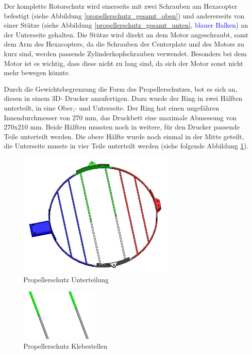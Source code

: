 	Der komplette Rotorschutz wird einerseits mit zwei Schrauben am Hexacopter befestigt (siehe Abbildung \ref{propellerschutz_gesamt_oben}) und andererseits von einer Stütze (siehe Abbildung  \ref{propellerschutz_gesamt_unten},
	\textcolor{blue}{blauer Balken}) an der Unterseite gehalten.
	Die Stütze wird direkt an dem Motor angeschraubt, samt dem Arm des Hexacopters, da die Schrauben der Centerplate und des Motors zu kurz sind, werden passende Zylinderkopfschrauben verwendet.
	Besonders bei dem Motor ist es wichtig, dass diese nicht zu lang sind, da sich der Motor sonst nicht mehr bewegen könnte.

	Durch die Gewichtsbegrenzung \bzw die Form des Propellerschutzes, bot es sich an, diesen in einem 3D- Drucker anzufertigen.
	Dazu wurde der Ring in zwei Hälften unterteilt, in eine Ober,- und Unterseite.
	Der Ring hat einen ungefähren Innendurchmesser von 270 mm, das Druckbett eine maximale Abmessung von 270x210 mm.
	Beide Hälften mussten noch in weitere, für den Drucker passende Teile unterteilt werden.
	Die obere Hälfte wurde noch einmal in der Mitte geteilt, die Unterseite musste in vier Teile unterteilt werden (siehe folgende Abbildung \ref{propellerschutz_mitte_unterteilung}).

			\begin{figure}[H]
			\begin{centering}
			\includegraphics[width = 0.7\textwidth]{Bilder/propellerschutz_mitte_unterteilung}
			\par\end{centering}
			\caption{Propellerschutz Unterteilung}
			\label{propellerschutz_mitte_unterteilung}
			\end{figure}

			\begin{figure}[H]
			\begin{centering}
			\includegraphics[width = 0.35\textwidth]{Bilder/propellerschutz_klebestellen}
			\par\end{centering}
			\caption{Propellerschutz Klebestellen}
			\label{propellerschutz_klebestellen}
			\end{figure}

